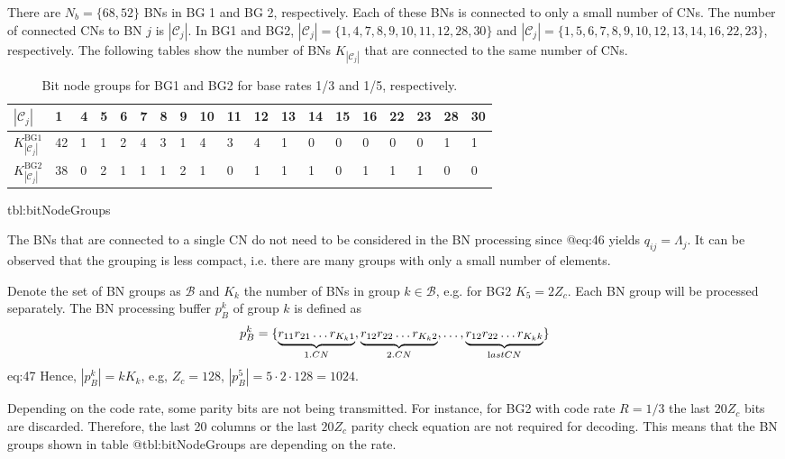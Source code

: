 \documentclass{article}
\def\Bcal{\mathcal{B}}
\def\Ccal{\mathcal{C}}
\def\Nb{{N_b}}
\def\Zc{{Z_c}}
\begin{document}
There are $\Nb = \{68,52\}$ BNs in BG 1 and BG 2, respectively. Each of these BNs is connected to only a small number of CNs. The number of connected CNs to BN $j$ is $|\Ccal_j|$. In BG1 and BG2, $|\Ccal_j|=\{1,4,7,8,9,10,11,12,28,30\}$ and $|\Ccal_j|=\{1,5,6,7,8,9,10,12,13,14,16,22,23\}$, respectively. The following tables show the number of BNs $K_{|\Ccal_j|}$ that are connected to the same number of CNs.

\begin{table}[ht]
  \centering
  \begin{tabular}{lllllllllllllllllll}
    \toprule
    $|\Ccal_j|$ & 1&4&5&6&7&8&9&10&11&12&13 & 14 & 15 & 16 & 22 & 23 &28&30 \\
    \midrule
    $K_{|\Ccal_j|}^\mathrm{BG1}$ & 42 & 1 & 1 & 2 & 4 & 3 & 1 & 4 & 3 & 4 & 1 & 0 & 0 & 0 & 0 & 0 & 1 & 1 \\
    $K_{|\Ccal_j|}^\mathrm{BG2}$ & 38 & 0 & 2 & 1 & 1 & 1 & 2 & 1 & 0 & 1 & 1 & 1 & 0 & 1 & 1 & 1 & 0 & 0\\
    \bottomrule
  \end{tabular}
  \caption{Bit node groups for BG1 and BG2 for base rates 1/3 and 1/5, respectively.}
\end{table}{tbl:bitNodeGroups}

The BNs that are connected to a single CN do not need to be considered in the BN processing since @eq:46 yields $q_{ij} = \Lambda_j$. It can be observed that the grouping is less compact, i.e. there are many groups with only a small number of elements.

Denote the set of BN groups as $\Bcal$ and $K_k$ the number of BNs in group $k\in\Bcal$, e.g. for BG2 $K_5=2\Zc$. Each BN group will be processed separately. The BN processing buffer $p_B^k$ of group $k$ is defined as
\begin{equation}
  p_B^k = \{\underbrace{r_{11}r_{21}\dots r_{K_k 1}}_{\text 1. CN},\underbrace{r_{12}r_{22}\dots r_{K_k 2}}_{\text 2. CN},\dots,\underbrace{r_{12}r_{22}\dots r_{K_k k}}_{\text last CN}\}
\end{equation}{eq:47}
Hence, $|p_B^k| = kK_k$, e.g, $\Zc=128$, $|p_B^5| = 5\cdot 2\cdot 128 = 1024$.

Depending on the code rate, some parity bits are not being transmitted. For instance, for BG2 with code rate $R = 1/3$ the last $20\Zc$ bits are discarded. Therefore, the last 20 columns or the last $20\Zc$ parity check equation are not required for decoding. This means that the BN groups shown in table {@tbl:bitNodeGroups} are depending on the rate.
\end{document}
